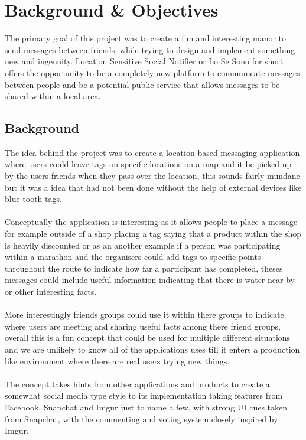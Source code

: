 \chapter{Background \& Objectives}

The primary goal of this project was to create a fun and interesting manor to send messages between friends, while trying to design and implement something new and ingenuity. Location Sensitive Social Notifier or Lo Se Sono for short offers the opportunity to be a completely new platform to communicate messages between people and be a potential public service that allows messages to be shared within a local area.

\section{Background}

The idea behind the project was to create a location based messaging application where users could leave tags on specific locations on a map and it be picked up by the users friends when they pass over the location, this sounds fairly mundane but it was a idea that had not been done without the help of external devices like blue tooth tags.\\
\\
Conceptually the application is interesting as it allows people to place a message for example outside of a shop placing a tag saying that a product within the shop is heavily discounted or as an another example if a person was participating within a marathon and the organisers could add tags to specific points throughout the route to indicate how far a participant has completed, theses messages could include useful information indicating that there is water near by or other interesting facts.\\
\\
More interestingly friends groups could use it within there groups to indicate where users are meeting and sharing useful facts among there friend groups, overall this is a fun concept that could be used for multiple different situations and we are unlikely to know all of the applications uses till it enters a production like environment where there are real users trying new things.\\
\\
The concept takes hints from other applications and products to create a somewhat social media type style to its implementation taking features from Facebook, Snapchat and Imgur just to name a few, with strong UI cues taken from Snapchat, with the commenting and voting system closely inspired by Imgur.

